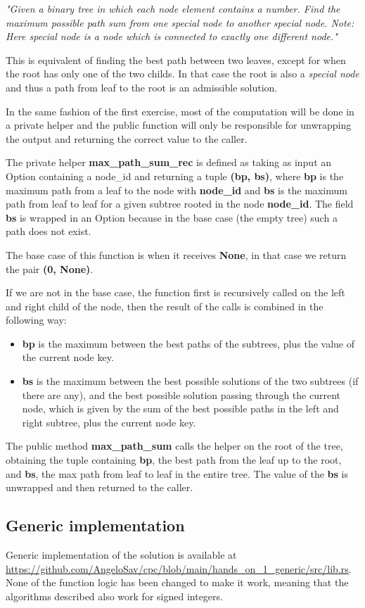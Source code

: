 \documentclass[12pt,a4paper]{article}
\begin{document}
\textit{"Given a binary tree in which each node element contains a number. Find the maximum possible path sum from one special node to another special node.
Note: Here special node is a node which is connected to exactly one different node."}

This is equivalent of finding the best path between two leaves, except for when the root has only one of the two childs. In that case the root is also a \textit{special node} and thus a path from leaf to the root is an admissible solution. 

In the same fashion of the first exercise, most of the computation will be done in a private helper and the public function will only be responsible for unwrapping the output and returning the correct value to the caller.

The private helper \textbf{max\_path\_sum\_rec} is defined as taking as input an Option containing a node\_id and returning a tuple \textbf{(bp, bs)}, where \textbf{bp} is the maximum path from a leaf to the node with \textbf{node\_id} and \textbf{bs} is the maximum path from leaf to leaf for a given subtree rooted in the node \textbf{node\_id}. The field \textbf{bs} is wrapped in an Option because in the base case (the empty tree) such a path does not exist.

The base case of this function is when it receives \textbf{None}, in that case we return the pair \textbf{(0, None)}.

If we are not in the base case, the function first is recursively called on the left and right child of the node, then the result of the calls is combined in the following way:

\begin{itemize}
    \item \textbf{bp} is the maximum between the best paths of the subtrees, plus the value of the current node key.
    \item \textbf{bs} is the maximum between the best possible solutions of the two subtrees (if there are any), and the best possible solution passing through the current node, which is given by the sum of the best possible paths in the left and right subtree, plus the current node key. 
\end{itemize}

The public method \textbf{max\_path\_sum} calls the helper on the root of the tree, obtaining the tuple containing \textbf{bp}, the best path from the leaf up to the root, and \textbf{bs}, the max path from leaf to leaf in the entire tree. The value of the \textbf{bs} is unwrapped and then returned to the caller.

\subsection*{Generic implementation}
Generic implementation of the solution is available at \url{https://github.com/AngeloSav/cpc/blob/main/hands_on_1_generic/src/lib.rs}.
None of the function logic has been changed to make it work, meaning that the algorithms described also work for signed integers.
\end{document}

